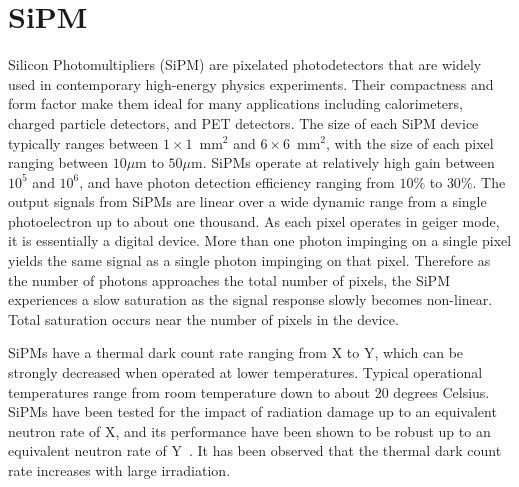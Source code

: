 \section{SiPM}
\label{sec:sipm}

Silicon Photomultipliers (SiPM) are pixelated photodetectors that are widely
used in contemporary high-energy physics experiments. Their compactness and form
factor make them ideal for many applications including calorimeters, charged
particle detectors, and PET detectors. The size of each SiPM device typically
ranges between $1\times 1$~$\mathrm{mm}^{2}$ and $6\times 6$~$\mathrm{mm}^{2}$,
with the size of each pixel ranging between $10\mu$m to $50\mu$m. SiPMs operate
at relatively high gain between $10^{5}$ and $10^{6}$, and have photon detection
efficiency ranging from $10\%$ to $30\%$. The output signals from SiPMs are
linear over a wide dynamic range from a single photoelectron up to about one
thousand. As each pixel operates in geiger mode, it is essentially a digital
device. More than one photon impinging on a single pixel yields the same signal
as a single photon impinging on that pixel. Therefore as the number of photons
approaches the total number of pixels, the SiPM experiences a slow saturation as
the signal response slowly becomes non-linear. Total saturation occurs near the
number of pixels in the device. 

SiPMs have a thermal dark count rate ranging from X to Y, which can be strongly 
decreased when operated at lower temperatures. Typical operational temperatures 
range from room temperature down to about $20$ degrees Celsius. SiPMs have been
tested for the impact of radiation damage up to an equivalent neutron rate of X, 
and its performance have been shown to be robust up to an equivalent neutron 
rate of Y~\cite{stuff}. It has been observed that the thermal dark count rate increases with 
large irradiation.





